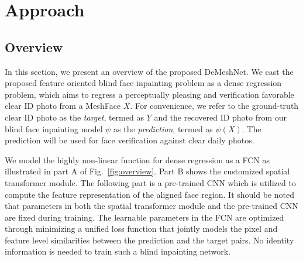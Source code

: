 \documentclass[10pt,twocolumn,letterpaper]{article}
\begin{document}










\section{Approach}



\subsection{Overview}
In this section, we present an overview of the proposed DeMeshNet. We cast the proposed feature oriented blind face inpainting problem as a dense regression problem, which aims to regress a perceptually pleasing and verification favorable clear ID photo from a MeshFace $X$. For convenience, we refer to the ground-truth clear ID photo as the \textit{target}, termed as $Y$  and the recovered ID photo from our blind face inpainting model $\psi$ as the \textit{prediction}, termed as $\psi ({X})$. The prediction will be used for face verification against clear daily photos.

We model the highly non-linear function for dense regression as a FCN as illustrated in part A of Fig.~\ref{fig:overview}. Part B shows the customized spatial transformer module. The following part is a pre-trained CNN which is utilized to compute the feature representation of the aligned face region. It should be noted that parameters in both the spatial transformer module and the pre-trained CNN are fixed during training. The learnable parameters in the FCN are optimized through minimizing a unified loss function that jointly models the pixel and feature level similarities between the prediction and the target pairs. No identity information is needed to train such a blind inpainting network.
\end{document}
